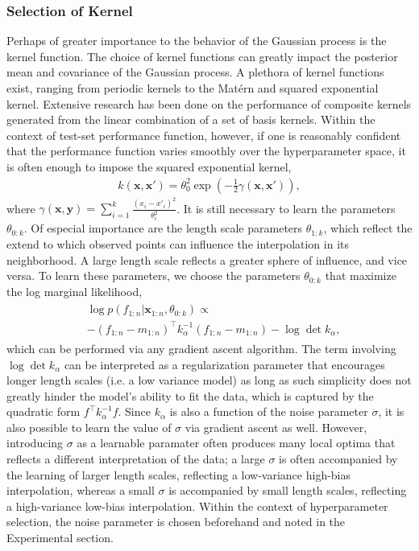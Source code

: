 \documentclass{article}
\newcommand{\x}{\mathbf{x}}
\newcommand{\y}{\mathbf{y}}
\newcommand{\paren}[1]{\left({#1}\right)}
\begin{document}
\subsubsection{Selection of Kernel}
Perhaps of greater importance to the behavior of the Gaussian process is the kernel function. The choice of kernel functions can greatly impact the posterior mean and covariance of the Gaussian process. A plethora of kernel functions exist, ranging from periodic kernels to the Mat\'{e}rn and squared exponential kernel. Extensive research has been done on the performance of composite kernels generated from the linear combination of a set of basis kernels. Within the context of test-set performance function, however, if one is reasonably confident that the performance function varies smoothly over the hyperparameter space, it is often enough to impose the squared exponential kernel,
\begin{align}
  k(\x, \x') = \theta_0^2\exp\paren{-\frac{1}{2} \gamma\paren{\x, \x'}},
\end{align}
where $\gamma\paren{\x,\y}=\sum_{i=1}^k \frac{\paren{x_i-x'_i}^2}{\theta_i^2}$. It is still necessary to learn the parameters $\theta_{0:k}$. Of especial importance are the length scale parameters $\theta_{1:k}$, which reflect the extend to which observed points can influence the interpolation in its neighborhood. A large length scale reflects a greater sphere of influence, and vice versa. To learn these parameters, we choose the parameters $\theta_{0:k}$ that maximize the log marginal likelihood,
\begin{align}
  \begin{split}
    &\log p \left(f_{1:n} \vert \x_{1:n}, \theta_{0:k}\right) \propto \\
    &-(f_{1:n} - m_{1:n})^\top k_\alpha^{-1}(f_{1:n} - m_{1:n}) - \log \det k_\alpha,
  \end{split}
\end{align}
which can be performed via any gradient ascent algorithm. The term involving $\log \det k_\alpha$ can be interpreted as a regularization parameter that encourages longer length scales (i.e. a low variance model) as long as such simplicity does not greatly hinder the model's ability to fit the data, which is captured by the quadratic form $f^\top k_\alpha^{-1}f$. Since $k_\alpha$ is also a function of the noise parameter $\sigma$, it is also possible to learn the value of $\sigma$ via gradient ascent as well. However, introducing $\sigma$ as a learnable paramater often produces many local optima that reflects a different interpretation of the data; a large $\sigma$ is often accompanied by the learning of larger length scales, reflecting a low-variance high-bias interpolation, whereas a small $\sigma$ is accompanied by small length scales, reflecting a high-variance low-bias interpolation. Within the context of hyperparameter selection, the noise parameter is chosen beforehand and noted in the Experimental section.
\end{document}
